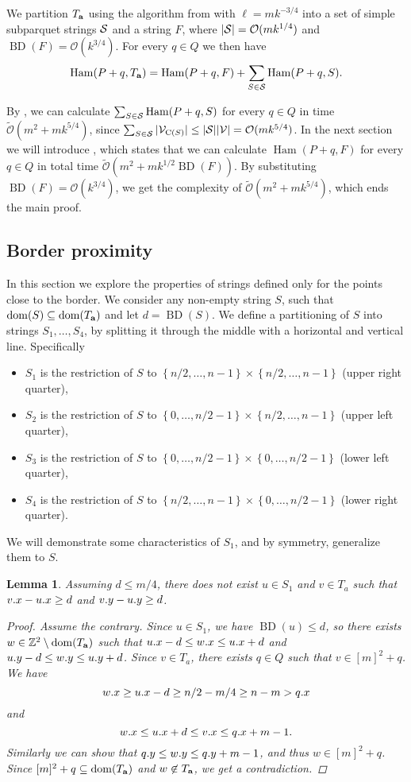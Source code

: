 \documentclass[11pt]{article}
\newcommand{\Z}{\mathbb{Z}}
\renewcommand{\O}{\mathcal{O}}
\newcommand{\tO}{\tilde{\mathcal{O}}}
\newcommand{\set}[1]{\left\lbrace #1 \right\rbrace}
\theoremstyle{plain}
\newtheorem{lemma}{Lemma}
\theoremstyle{definition}
\theoremstyle{remark}
\DeclareMathOperator*{\Ham}{Ham}
\DeclareMathOperator*{\BD}{BD}
\begin{document}
We partition $\Ta$ using the algorithm from  with $\ell = mk^{-3/4}$ into a set of simple subparquet strings $\S$ and a string $F$,
where $|\S| = \O(mk^{1/4})$ and $\BD(F) = \O(k^{3 / 4})$.
For every $q \in Q$ we then have
$$ \Ham(P + q, \Ta) = \Ham(P + q, F) + \sum_{S \in \S} \Ham(P + q, S).$$

By , we can calculate $\sum_{S \in \S} \Ham(P + q, S)$ for every $q \in Q$ in time $\tO(m^2 + mk^{5/4})$,
since $\sum_{S \in \S} |\V_{\getchar{S}}| \le |\S| |\V| = \O(mk^{5/4})$.
In the next section we will introduce , which states that we can calculate $\Ham(P + q, F)$ for every $q \in Q$ in total time $\tO(m^2 + mk^{1/2} \BD(F))$.
By substituting $\BD(F) = \O(k^{3/4})$, we get the complexity of $\tO(m^2 + mk^{5/4})$, which ends the main proof.


\subsection{Border proximity}
In this section we explore the properties of strings defined only for the points close to the border.
We consider any non-empty string $S$, such that $\d{S} \subseteq \d{\Ta}$ and let $d = \BD(S)$.
We define a partitioning of $S$ into strings $S_1, \dots, S_4$, by splitting it through the middle with a horizontal and vertical line. 
Specifically
\begin{itemize}
	\item $S_1$ is the restriction of $S$ to $\set{n / 2, \dots, n - 1} \times \set{n / 2, \dots, n - 1}$ (upper right quarter),
	\item $S_2$ is the restriction of $S$ to $\set{0, \dots, n / 2 - 1} \times \set{n / 2, \dots, n - 1}$ (upper left quarter),
	\item $S_3$ is the restriction of $S$ to $\set{0, \dots, n / 2 - 1} \times \set{0, \dots, n / 2 - 1}$ (lower left quarter),
	\item $S_4$ is the restriction of $S$ to $\set{n / 2, \dots, n - 1} \times \set{0, \dots, n / 2 - 1}$ (lower right quarter).
\end{itemize}
We will demonstrate some characteristics of $S_1$, and by symmetry, generalize them to $S$.

\begin{lemma} \label{border_lemma}
	Assuming $d \le m/4$, there does not exist $u \in S_1$ and $v \in T_a$ such that $\x{v} - \x{u} \ge d$ and $\y{v} - \y{u} \ge d$.
	\begin{proof}
		Assume the contrary.
		Since $u \in S_1$, we have $\BD(u) \le d$, so there exists $w \in \Z^2 \setminus \d{\Ta}$ such that
		$\x{u} - d \le \x{w} \le \x{u} + d$ and
		$\y{u} - d \le \y{w} \le \y{u} + d$.
		Since $v \in T_a$, there exists $q \in Q$ such that $v \in [m]^2 + q$.
		We have
		$$ \x{w} \ge \x{u} - d \ge n / 2 - m / 4 \ge n - m > \x{q} $$
		and
		$$ \x{w} \le \x{u} + d \le \x{v} \le \x{q} + m - 1. $$
		Similarly we can show that $\y{q} \le \y{w} \le \y{q} + m - 1$, and thus $w \in [m]^2 + q$.
		Since $[m]^2 + q \subseteq \d{\Ta}$ and $w \not \in \Ta$, we get a contradiction.
	\end{proof}
\end{lemma}
\end{document}
